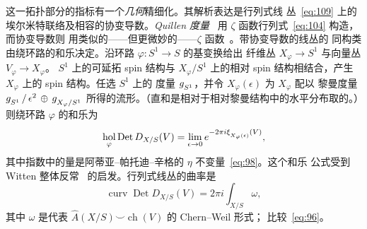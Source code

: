 \documentclass[11pt]{amsart}
\theoremstyle{definition}
\theoremstyle{remark}
\theoremstyle{plain}
\numberwithin{equation}{section}
\renewcommand{\:}{\colon}
\newcommand{\Ahat}{{\hat A}}
\newcommand{\RR}{{\mathbb R}}
\newcommand{\ZZ}{{\mathbb Z}}
\DeclareMathOperator{\ch}{ch}
\newcommand{\cir}{S^1}
\DeclareRobustCommand{\mstrut}{^{\vphantom{1*\prime y\vee M}}}
\DeclareMathOperator{\Det}{Det}
\DeclareMathOperator{\curv}{curv}
\DeclareMathOperator{\hol}{hol}
\newcommand{\RZ}{\RR/\ZZ}
\newcommand{\xia}[1]{\xi \mstrut _{#1}}
\begin{document}
这一拓扑部分的指标有一个\emph{几何}精细化。其解析表达是行列式线
丛~\eqref{eq:109} 上的埃尔米特联络及相容的协变导数。\emph{Quillen
度量}~\cite{Q} 用 $\zeta$ 函数行列式~\eqref{eq:104} 构造，而协变导数则
用类似的——但更微妙的——$\zeta$ 函数~\cite{BiF1}。带协变导数的线丛的
同构类由绕环路的和乐决定。沿环路 $\varphi \:\cir\to S$ 的基变换给出
纤维丛 $X_\varphi \to \cir$ 与向量丛 $V_\varphi \to X_{\varphi }$。
$\cir$ 上的可延拓 spin 结构与 $X_\varphi /\cir$ 上的相对
spin 结构相结合，产生 $X_\varphi $ 上的 spin 结构。任选 $\cir$ 上的
度量 $g\mstrut _{\cir}$，并令 $X_\varphi (\epsilon )$ 为 $X_\varphi $ 配以
黎曼度量 $g\mstrut _{\cir}\,/\,\epsilon ^2\,\oplus \,g\mstrut _{X_\varphi /\cir}$
所得的流形。（直和是相对于相对黎曼结构中的水平分布取的。）则绕环路
$\varphi $ 的和乐为~\cite{BiF2}
  \begin{equation}\label{eq:110}
     \hol_\varphi \Det D_{X/S}(V) = \lim\limits_{\epsilon \to0}e^{-2\pi i\xia
     {X_\varphi (\epsilon )}(V)}, 
  \end{equation}
其中指数中的量是阿蒂亚–帕托迪–辛格的 $\eta$ 不变量~\eqref{eq:98}。这个和乐
公式受到 Witten 整体反常~\cite{Wi3} 的启发。行列式线丛的曲率是
  \begin{equation}\label{eq:111}
     \curv\Det D_{X/S}(V) = 2\pi i\int_{X/S}\omega , 
  \end{equation}
其中 $\omega$ 是代表 $\Ahat(X/S)\smallsmile\ch(V)$ 的 Chern–Weil 形式；
比较~\eqref{eq:96}。
\end{document}
